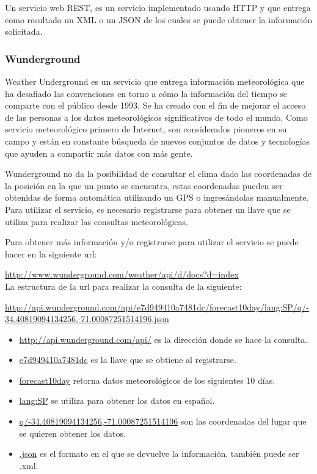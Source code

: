 \documentclass[11pt,letterpaper]{article}
\begin{document}
Un servicio web REST, es un servicio implementado usando HTTP y que entrega como resultado un XML o un JSON de los cuales se puede obtener la información solicitada.


\subsubsection{Wunderground}

Weather Underground es un servicio que entrega información meteorológica que ha desafiado las convenciones en torno a cómo la información del tiempo se comparte con el público desde 1993. Se ha creado con el fin de mejorar el acceso de las personas a los datos meteorológicos significativos de todo el mundo. Como servicio meteorológico primero de Internet, son considerados pioneros en su campo y están en constante búsqueda de nuevos conjuntos de datos y tecnologías que ayuden a compartir más datos con más gente.

Wunderground no da la posibilidad de consultar el clima dado las coordenadas de la posición en la que un punto se encuentra, estas coordenadas pueden ser obtenidas de forma automática utilizando un GPS o ingresándolas manualmente. Para utilizar el servicio, es necesario registrarse para obtener un llave que se utiliza para realizar las consultas meteorológicas.

Para obtener más información y/o registrarse para utilizar el servicio se puede hacer en la siguiente url: 

\url{http://www.wunderground.com/weather/api/d/docs?d=index}\\

La estructura de la url para realizar la consulta de la siguiente:

\url{http://api.wunderground.com/api/e7d949410a7481dc/forecast10day/lang:SP/q/-34.40819094134256,-71.00087251514196.json}

\begin{itemize}
\item \url{http://api.wunderground.com/api/} es la dirección donde se hace la consulta.
\item \url{e7d949410a7481dc} es la llave que se obtiene al registrarse.
\item \url{forecast10day} retorna datos meteorológicos de los siguientes 10 días.
\item \url{lang:SP} se utiliza para obtener los datos en español.
\item \url{q/-34.40819094134256,-71.00087251514196} son las coordenadas del lugar que se quieren obtener los datos.
\item \url{.json} es el formato en el que se devuelve la información, también puede ser .xml.
\end{itemize}
\end{document}

